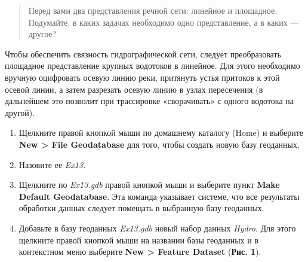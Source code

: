 \documentclass[12pt,]{book}
\begin{document}
\begin{quote}
Перед вами два представления речной сети: линейное и площадное. Подумайте, в каких задачах необходимо одно представление, а в каких --- другое?
\end{quote}

Чтобы обеспечить связность гидрографической сети, следует преобразовать площадное представление крупных водотоков в линейное. Для этого необходимо вручную оцифровать осевую линию реки, притянуть устья притоков к этой осевой линии, а затем разрезать осевую линию в узлах пересечения (в дальнейшем это позволит при трассировке «сворачивать» с одного водотока на другой).

\begin{enumerate}
\def\labelenumi{\arabic{enumi}.}
\item
  Щелкните правой кнопкой мыши по домашнему каталогу (Home) и выберите \textbf{New \textgreater{} File Geodatabase} для того, чтобы создать новую базу геоданных.
\item
  Назовите ее \emph{Ex13.}
\item
  Щелкните по \emph{Ex13.gdb} правой кнопкой мыши и выберите пункт \textbf{Make Default Geodatabase}. Эта команда указывает системе, что все результаты обработки данных следует помещать в выбранную базу геоданных.
\item
  Добавьте в базу геоданных \emph{Ex13.gdb} новый набор данных \emph{Hydro}. Для этого щелкните правой кнопкой мыши на названии базы геоданных и в контекстном меню выберите \textbf{New \textgreater{} Feature Dataset} (\textbf{Рис. 1}).


\end{enumerate}
\end{document}

